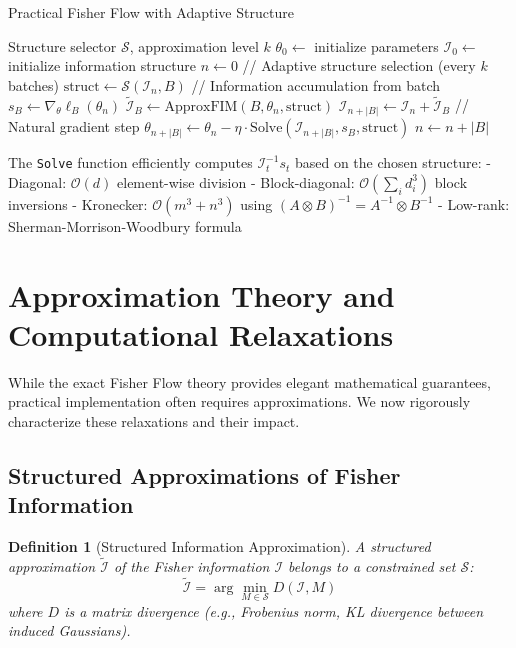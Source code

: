 \documentclass[11pt]{article}
\newtheorem{definition}[theorem]{Definition}
\begin{document}
\begin{algorithm}[h]
\caption{Practical Fisher Flow with Adaptive Structure}
\label{alg:practical_lpi}
\begin{algorithmic}[1]
\Require Structure selector $\mathcal{S}$, approximation level $k$
\State $\theta_0 \gets$ initialize parameters
\State $\mathcal{I}_0 \gets$ initialize information structure  
\State $n \gets 0$ 
 
\State // Adaptive structure selection (every $k$ batches)
\State $\text{struct} \gets \mathcal{S}(\mathcal{I}_n, B)$ 
\EndIf
\State // Information accumulation from batch
\State $s_B \gets \nabla_\theta \ell_{B}(\theta_n)$ 
\State $\tilde{\mathcal{I}}_{B} \gets \text{ApproxFIM}(B, \theta_n, \text{struct})$
\State $\mathcal{I}_{n+|B|} \gets \mathcal{I}_n + \tilde{\mathcal{I}}_{B}$
\State // Natural gradient step
\State $\theta_{n+|B|} \gets \theta_n - \eta \cdot \text{Solve}(\mathcal{I}_{n+|B|}, s_B, \text{struct})$
\State $n \gets n + |B|$ 
\EndFor
\end{algorithmic}
\end{algorithm}

The \texttt{Solve} function efficiently computes $\mathcal{I}_t^{-1}s_t$ based on the chosen structure:
- Diagonal: $\mathcal{O}(d)$ element-wise division
- Block-diagonal: $\mathcal{O}(\sum_i d_i^3)$ block inversions  
- Kronecker: $\mathcal{O}(m^3 + n^3)$ using $(A \otimes B)^{-1} = A^{-1} \otimes B^{-1}$
- Low-rank: Sherman-Morrison-Woodbury formula

\section{Approximation Theory and Computational Relaxations}

While the exact Fisher Flow theory provides elegant mathematical guarantees, practical implementation often requires approximations. We now rigorously characterize these relaxations and their impact.

\subsection{Structured Approximations of Fisher Information}

\begin{definition}[Structured Information Approximation]
A structured approximation $\tilde{\mathcal{I}}$ of the Fisher information $\mathcal{I}$ belongs to a constrained set $\mathcal{S}$:
\begin{equation}
\tilde{\mathcal{I}} = \arg\min_{M \in \mathcal{S}} D(\mathcal{I}, M)
\end{equation}
where $D$ is a matrix divergence (e.g., Frobenius norm, KL divergence between induced Gaussians).
\end{definition}
\end{document}
